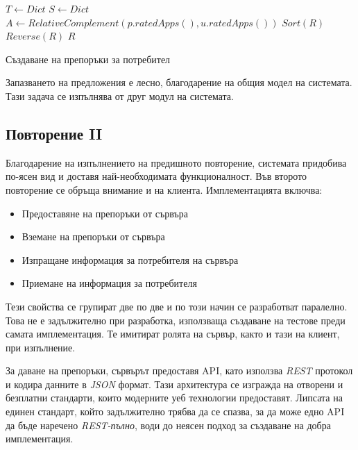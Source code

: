 		\begin{algorithm}[htbp]
			\label{algorithm:get-recommendations}
			$T \longleftarrow Dict $\;
			$S \longleftarrow Dict $\;
			$A \longleftarrow RelativeComplement(p.ratedApps(), u.ratedApps())$\;
			$Sort(R)$\;
			$Reverse(R)$\;
			\Return $R$\;
			\caption{Създаване на препоръки за потребител}
		\end{algorithm}
		
		\vspace{2em}
		
		Запазването на предложения е лесно, благодарение на общия модел на системата. Тази задача се изпълнява от друг модул на системата.
		
		\subsection{Повторение II}
		
		Благодарение на изпълнението на предишното повторение, системата придобива по-ясен вид и доставя най-необходимата функционалност. Във второто повторение се обръща внимание и на клиента. Имплементацията включва:
		
		\begin{itemize}
			\item Предоставяне на препоръки от сървъра
			\item Вземане на препоръки от сървъра
			\item Изпращане информация за потребителя на сървъра
			\item Приемане на информация за потребителя
		\end{itemize}
		
		Тези свойства се групират две по две и по този начин се разработват паралелно. Това не е задължително при разработка, използваща създаване на тестове преди самата имплементация. Те имитират ролята на сървър, както и тази на клиент, при изпълнение.
		
		За даване на препоръки, сървърът предоставя \ac{API}, като използва \emph{REST} протокол и кодира данните в \emph{JSON} формат. Тази архитектура се изгражда на отворени и безплатни стандарти, които модерните уеб технологии предоставят. Липсата на единен стандарт, който задължително трябва да се спазва, за да може едно \ac{API} да бъде наречено \emph{REST-пълно}, води до неясен подход за създаване на добра имплементация.
		
